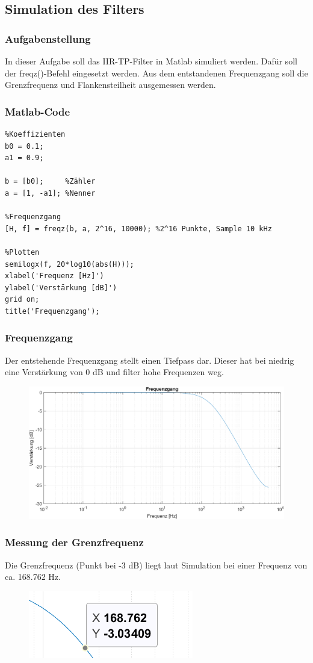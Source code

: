 \documentclass{article}
\begin{document}
\subsection{Simulation des Filters}
\subsubsection{Aufgabenstellung}
In dieser Aufgabe soll das IIR-TP-Filter in Matlab simuliert werden. Dafür soll der freqz()-Befehl eingesetzt werden. Aus dem entstandenen Frequenzgang soll die Grenzfrequenz und Flankensteilheit ausgemessen werden.

\subsubsection{Matlab-Code}
\begin{verbatim}
%Koeffizienten
b0 = 0.1;
a1 = 0.9;

b = [b0];     %Zähler
a = [1, -a1]; %Nenner

%Frequenzgang
[H, f] = freqz(b, a, 2^16, 10000); %2^16 Punkte, Sample 10 kHz

%Plotten
semilogx(f, 20*log10(abs(H)));
xlabel('Frequenz [Hz]')
ylabel('Verstärkung [dB]')
grid on;
title('Frequenzgang');
\end{verbatim}
\newpage
\subsubsection{Frequenzgang}
Der entstehende Frequenzgang stellt einen Tiefpass dar. Dieser hat bei niedrig eine Verstärkung von 0 dB und filter hohe Frequenzen weg.
\begin{figure}[h]
    \centering
    \includegraphics[width=0.8\linewidth]{img/Bode_04.png}
\end{figure}

\subsubsection{Messung der Grenzfrequenz}
Die Grenzfrequenz (Punkt bei -3 dB) liegt laut Simulation bei einer Frequenz von ca. 168.762 Hz.
\begin{figure}[h]
    \includegraphics[width=0.25\linewidth]{img/Bode_Mess_01.png}
\end{figure}
\end{document}
